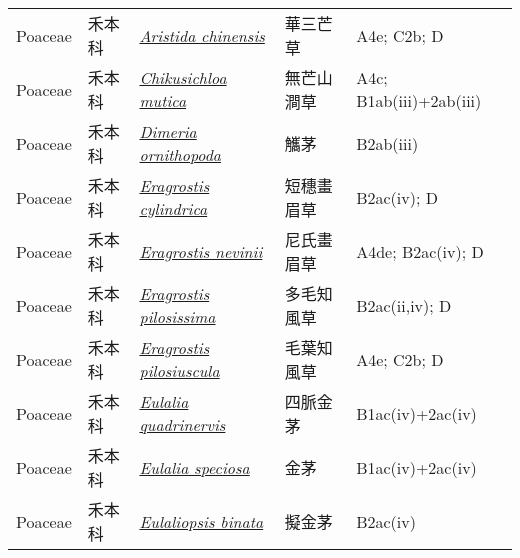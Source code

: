 {\begin{longtable}{p{2.5cm}p{2cm}p{5cm}p{2.5cm}p{3cm}}
    Poaceae & 禾本科 & \href{http://www.theplantlist.org/tpl1.1/search?q=Aristida+chinensis}{\textit{Aristida chinensis} } & 華三芒草 & A4e; C2b; D \index{Aristida@\textit{Aristida}!chinensis@\textit{chinensis}}  \index{華三芒草} \\
    Poaceae & 禾本科 & \href{http://www.theplantlist.org/tpl1.1/search?q=Chikusichloa+mutica}{\textit{Chikusichloa mutica} } & 無芒山澗草 & A4c; B1ab(iii)+2ab(iii) \index{Chikusichloa@\textit{Chikusichloa}!mutica@\textit{mutica}}  \index{無芒山澗草} \\
    Poaceae & 禾本科 & \href{http://www.theplantlist.org/tpl1.1/search?q=Dimeria+ornithopoda}{\textit{Dimeria ornithopoda} } & 觿茅 & B2ab(iii) \index{Dimeria@\textit{Dimeria}!ornithopoda@\textit{ornithopoda}}  \index{觿茅} \\
    Poaceae & 禾本科 & \href{http://www.theplantlist.org/tpl1.1/search?q=Eragrostis+cylindrica}{\textit{Eragrostis cylindrica} } & 短穗畫眉草 & B2ac(iv); D \index{Eragrostis@\textit{Eragrostis}!cylindrica@\textit{cylindrica}}  \index{短穗畫眉草} \\
    Poaceae & 禾本科 & \href{http://www.theplantlist.org/tpl1.1/search?q=Eragrostis+nevinii}{\textit{Eragrostis nevinii} } & 尼氏畫眉草 & A4de; B2ac(iv); D \index{Eragrostis@\textit{Eragrostis}!nevinii@\textit{nevinii}}  \index{尼氏畫眉草} \\
    Poaceae & 禾本科 & \href{http://www.theplantlist.org/tpl1.1/search?q=Eragrostis+pilosissima}{\textit{Eragrostis pilosissima} } & 多毛知風草 & B2ac(ii,iv); D \index{Eragrostis@\textit{Eragrostis}!pilosissima@\textit{pilosissima}}  \index{多毛知風草} \\
    Poaceae & 禾本科 & \href{http://www.theplantlist.org/tpl1.1/search?q=Eragrostis+pilosiuscula}{\textit{Eragrostis pilosiuscula} } & 毛葉知風草 & A4e; C2b; D \index{Eragrostis@\textit{Eragrostis}!pilosiuscula@\textit{pilosiuscula}}  \index{毛葉知風草} \\
    Poaceae & 禾本科 & \href{http://www.theplantlist.org/tpl1.1/search?q=Eulalia+quadrinervis}{\textit{Eulalia quadrinervis} } & 四脈金茅 & B1ac(iv)+2ac(iv) \index{Eulalia@\textit{Eulalia}!quadrinervis@\textit{quadrinervis}}  \index{四脈金茅} \\
    Poaceae & 禾本科 & \href{http://www.theplantlist.org/tpl1.1/search?q=Eulalia+speciosa}{\textit{Eulalia speciosa} } & 金茅 & B1ac(iv)+2ac(iv) \index{Eulalia@\textit{Eulalia}!speciosa@\textit{speciosa}}  \index{金茅} \\
    Poaceae & 禾本科 & \href{http://www.theplantlist.org/tpl1.1/search?q=Eulaliopsis+binata}{\textit{Eulaliopsis binata} } & 擬金茅 & B2ac(iv) \index{Eulaliopsis@\textit{Eulaliopsis}!binata@\textit{binata}}  \index{擬金茅} \\

\end{longtable}}
